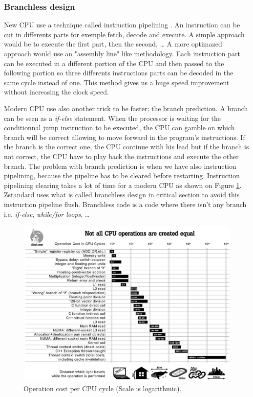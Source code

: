 \documentclass{sig-alternate-05-2015}
\begin{document}
    \subsubsection{Branchless design}
        New CPU use a technique called instruction pipelining \cite{pipelining}. An instruction can be
        cut in differents parts for exemple fetch, decode and execute. A simple approach would be to
        execute the first part, then the second, \ldots{} A more optimazed approach would use an
        "assembly line" like methodology. Each instruction part can be executed in a different
        portion of the CPU and then passed to the following portion so three differents instructions
        parts can be decoded in the same cycle instead of one. This method gives us a huge speed
        improvement without increasing the clock speed.

        Modern CPU use also another trick to be faster; the branch prediction. A branch can be seen
        as a \textit{if-else} statement. When the processor is waiting for the conditionnal jump
        instruction to be executed, the CPU can gamble on which branch will be correct allowing to
        move forward in the program's instructions. If the branch is the correct one, the CPU
        continue with his lead but if the branch is not correct, the CPU have to play back the
        instructions and execute the other branch. The problem with branch prediction is when we
        have also instruction pipelining, because the pipeline has to be cleared before restarting.
        Instruction pipelining clearing takes a lot of time for a modern CPU as shown on Figure
        \ref{fig:costop}. Zstandard uses what is called branchless design in critical section to
        avoid this instruction pipeline flush. Branchless code is a code where there isn't any
        branch i.e. \textit{if-else}, \textit{while/for loops}, \ldots

        \begin{figure}
            \centerline{\includegraphics[scale=0.11]{costCPUop.png}}
            \caption{Operation cost per CPU cycle (Scale is logarithmic).}
            \label{fig:costop}
        \end{figure}
\end{document}
